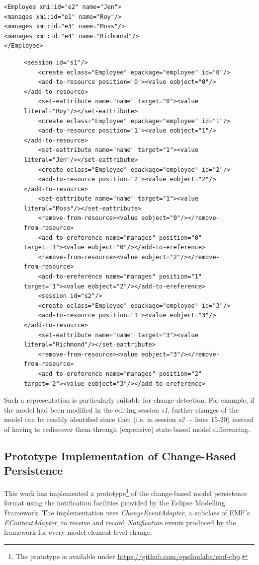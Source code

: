 \documentclass[12pt, a4paper]{report} \usepackage[titletoc]{appendix}
\begin{document}
\begin{lstlisting}[style=xmi,caption={State-based representation of the model of Figure \ref{fig:modified_chart} in (simplified) XMI.},label=lst:xmimodel_0]
<Employee xmi:id="e2" name="Jen">
<manages xmi:id="e1" name="Roy"/>
<manages xmi:id="e3" name="Moss"/>
<manages xmi:id="e4" name="Richmond"/>
</Employee>
\end{lstlisting}

\begin{figure}[h]
	\begin{lstlisting}[style=xml,caption={Change-based representation of the model of Figure \ref{fig:modified_chart}.},label=lst:cbpmodel_0]
	<session id="s1"/>
	<create eclass="Employee" epackage="employee" id="0"/>
	<add-to-resource position="0"><value eobject="0"/></add-to-resource>
	<set-eattribute name="name" target="0"><value literal="Roy"/></set-eattribute>
	<create eclass="Employee" epackage="employee" id="1"/>
	<add-to-resource position="1"><value eobject="1"/></add-to-resource>
	<set-eattribute name="name" target="1"><value literal="Jen"/></set-eattribute>
	<create eclass="Employee" epackage="employee" id="2"/>
	<add-to-resource position="2"><value eobject="2"/></add-to-resource>
	<set-eattribute name="name" target="1"><value literal="Moss"/></set-eattribute>
	<remove-from-resource><value eobject="0"/></remove-from-resource>
	<add-to-ereference name="manages" position="0" target="1"><value eobject="0"/></add-to-ereference>
	<remove-from-resource><value eobject="2"/></remove-from-resource>
	<add-to-ereference name="manages" position="1" target="1"><value eobject="2"/></add-to-ereference>
	<session id="s2"/>
	<create eclass="Employee" epackage="employee" id="3"/>
	<add-to-resource position="1"><value eobject="3"/></add-to-resource>
	<set-eattribute name="name" target="3"><value literal="Richmond"/></set-eattribute>
	<remove-from-resource><value eobject="3"/></remove-from-resource>
	<add-to-ereference name="manages" position="2" target="2"><value eobject="3"/></add-to-ereference>
	\end{lstlisting}
\end{figure}

Such a representation is particularly suitable for change-detection. For example, if the model had been modified in the editing session \emph{s1}, further changes of the model can be readily identified since then (i.e. in session \emph{s2} –- lines 15-20) instead of having to rediscover them through (expensive) state-based model differencing.

\subsection{Prototype Implementation of Change-Based Persistence}
\label{subsec:prototype_implementation_of_change-based_persistence}
This work has implemented a prototype\footnote{The prototype is available under \url{https://github.com/epsilonlabs/emf-cbp}.} of the change-based model persistence format using the notification facilities provided by the Eclipse Modelling Framework. The implementation uses \emph{ChangeEventAdapter}, a subclass of EMF's \emph{EContentAdapter}, to receive and record \emph{Notification} events produced by the framework for every model-element level change.
\end{document}

